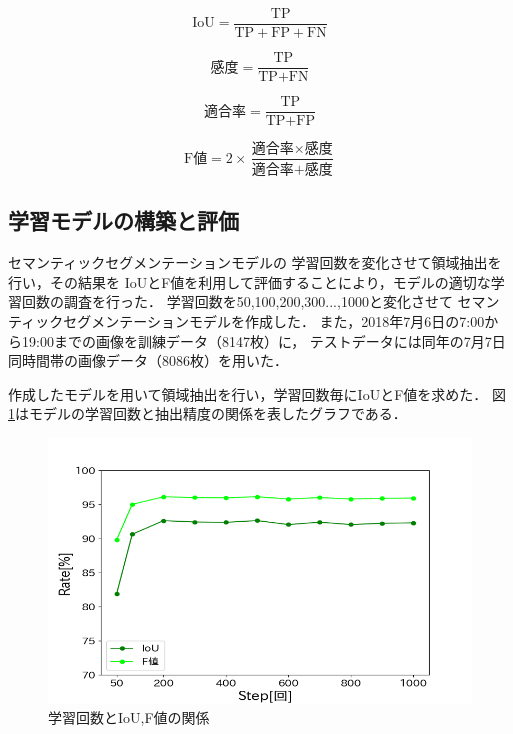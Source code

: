 \begin{equation}
  \label{IoU}
  \mbox{IoU} =  \frac{\mbox{TP}}{\mbox{TP}+\mbox{FP}+\mbox{FN}}
\end{equation}

\begin{equation}
  \label{Recall}
  \mbox{感度} =  \frac{\mbox{TP}}{\mbox{TP}+\mbox{FN}}
\end{equation}

\begin{equation}
  \label{Precision}
  \mbox{適合率} =  \frac{\mbox{TP}}{\mbox{TP}+\mbox{FP}}
\end{equation}

\begin{equation}
  \label{F score}
  \mbox{F値} =  2×\frac{\mbox{適合率}×\mbox{感度}}{\mbox{適合率}+\mbox{感度}}
\end{equation}
\vspace{5mm}
\clearpage

\subsection{学習モデルの構築と評価}
\label{5.1}
セマンティックセグメンテーションモデルの
学習回数を変化させて領域抽出を行い，その結果を
IoUとF値を利用して評価することにより，モデルの適切な学習回数の調査を行った．
学習回数を50,100,200,300...,1000と変化させて
セマンティックセグメンテーションモデルを作成した．
また，2018年7月6日の7:00から19:00までの画像を訓練データ（8147枚）に，
テストデータには同年の7月7日同時間帯の画像データ（8086枚）を用いた．

作成したモデルを用いて領域抽出を行い，学習回数毎にIoUとF値を求めた．
図\ref{learn}はモデルの学習回数と抽出精度の関係を表したグラフである．

\begin{figure}[ht] 
  \begin{center}
    \includegraphics[width=150mm]{image/Step_IoU_F.png}
  \end{center}
  \caption{学習回数とIoU,F値の関係}
  \label{learn}
\end{figure}
\clearpage

